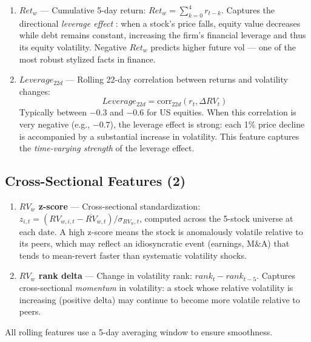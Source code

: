 \documentclass[11pt,a4paper]{article}
\begin{document}
\begin{enumerate}
    \item \textbf{$Ret_w$} --- Cumulative 5-day return: $Ret_w = \sum_{k=0}^{4} r_{t-k}$. Captures the directional \textit{leverage effect} \citep{black1976}: when a stock's price falls, equity value decreases while debt remains constant, increasing the firm's financial leverage and thus its equity volatility. Negative $Ret_w$ predicts higher future vol --- one of the most robust stylized facts in finance.

    \item \textbf{$Leverage_{22d}$} --- Rolling 22-day correlation between returns and volatility changes:
    \begin{equation}
        Leverage_{22d} = \text{corr}_{22d}(r_t, \Delta RV_t)
    \end{equation}
    Typically between $-0.3$ and $-0.6$ for US equities. When this correlation is very negative (e.g., $-0.7$), the leverage effect is strong: each 1\% price decline is accompanied by a substantial increase in volatility. This feature captures the \textit{time-varying strength} of the leverage effect.
\end{enumerate}

\subsection{Cross-Sectional Features (2)}

\begin{enumerate}
    \item \textbf{$RV_w$ z-score} --- Cross-sectional standardization: $z_{i,t} = (RV_{w,i,t} - \overline{RV}_{w,t}) / \sigma_{RV_w,t}$, computed across the 5-stock universe at each date. A high z-score means the stock is anomalously volatile relative to its peers, which may reflect an idiosyncratic event (earnings, M\&A) that tends to mean-revert faster than systematic volatility shocks.

    \item \textbf{$RV_w$ rank delta} --- Change in volatility rank: $rank_t - rank_{t-5}$. Captures cross-sectional \textit{momentum} in volatility: a stock whose relative volatility is increasing (positive delta) may continue to become more volatile relative to peers.
\end{enumerate}

All rolling features use a 5-day averaging window to ensure smoothness.

\newpage
%
%
\end{document}
